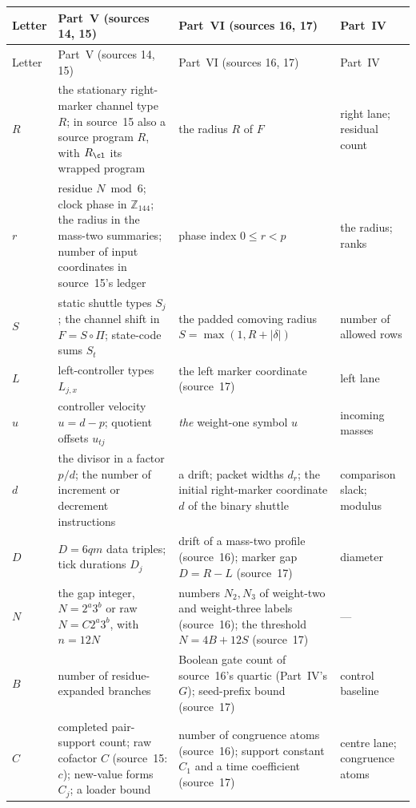 \documentclass[11pt,letterpaper]{article}
\numberwithin{equation}{section}
\theoremstyle{definition}
\theoremstyle{remark}
\newcommand{\Z}{\mathbb Z}
\begin{document}
\begin{center}
\small
\renewcommand{\theHtable}{smc.tm.notation.\arabic{table}}%
\begin{longtable}{@{}L{0.06\textwidth}L{0.36\textwidth}L{0.32\textwidth}L{0.16\textwidth}@{}}
\toprule
Letter & Part~V (sources 14, 15) & Part~VI (sources 16, 17) & Part~IV\\
\midrule
\endfirsthead
\toprule
Letter & Part~V (sources 14, 15) & Part~VI (sources 16, 17) & Part~IV\\
\midrule
\endhead
$R$ & the stationary right-marker channel type $R$; in source~15 also a source program $R$, with $R_{\cl}$ its wrapped program & the radius $R$ of $F$ & right lane; residual count\\
$r$ & residue $N\bmod6$; clock phase in $\Z_{144}$; the radius in the mass-two summaries; number of input coordinates in source~15's ledger & phase index $0\le r<p$ & the radius; ranks\\
$S$ & static shuttle types $S_j$; the channel shift in $F=S\circ\Pi$; state-code sums $S_t$ & the padded comoving radius $S=\max(1,R+|\delta|)$ & number of allowed rows\\
$L$ & left-controller types $L_{j,x}$ & the left marker coordinate (source~17) & left lane\\
$u$ & controller velocity $u=d-p$; quotient offsets $u_{tj}$ & \emph{the} weight-one symbol $u$ & incoming masses\\
$d$ & the divisor in a factor $p/d$; the number of increment or decrement instructions & a drift; packet widths $d_r$; the initial right-marker coordinate $d$ of the binary shuttle & comparison slack; modulus\\
$D$ & $D=6qm$ data triples; tick durations $D_j$ & drift of a mass-two profile (source~16); marker gap $D=R-L$ (source~17) & diameter\\
$N$ & the gap integer, $N=2^a3^b$ or raw $N=C2^a3^b$, with $n=12N$ & numbers $N_2,N_3$ of weight-two and weight-three labels (source~16); the threshold $N=4B+12S$ (source~17) & ---\\
$B$ & number of residue-expanded branches & Boolean gate count of source~16's quartic (Part~IV's $G$); seed-prefix bound (source~17) & control baseline\\
$C$ & completed pair-support count; raw cofactor $C$ (source~15: $c$); new-value forms $C_j$; a loader bound & number of congruence atoms (source~16); support constant $C_1$ and a time coefficient (source~17) & centre lane; congruence atoms\\

\end{longtable}
\end{center}
\end{document}
